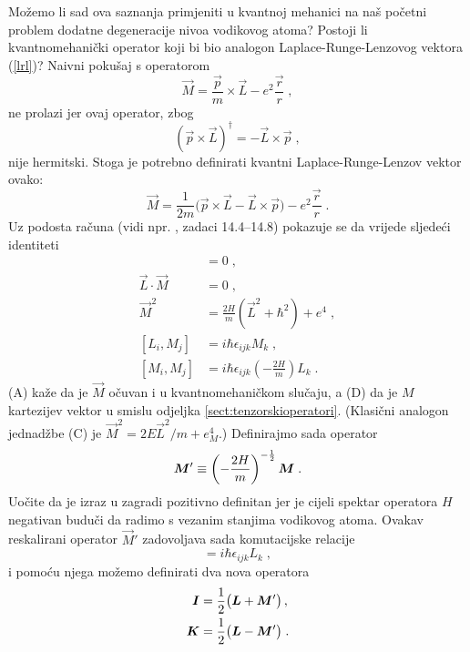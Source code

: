 Možemo li sad ova saznanja primjeniti u kvantnoj mehanici na naš
početni problem dodatne degeneracije nivoa vodikovog atoma?
Postoji li kvantnomehanički operator koji bi bio analogon 
Laplace-Runge-Lenzovog vektora (\ref{lrl})? Naivni pokušaj
s operatorom
\begin{equation}
  \vec{M} = \frac{\vec{p}}{m}\times\vec{L} - e^2\frac{\vec{r}}{r} \;,
\end{equation}
ne prolazi jer ovaj operator, zbog 
\begin{displaymath}
    (\vec{p}\times\vec{L})^\dagger = - \vec{L}\times\vec{p} \;,
\end{displaymath}
nije hermitski. Stoga je potrebno definirati kvantni
Laplace-Runge-Lenzov vektor ovako:
\begin{equation}
  \vec{M} = \frac{1}{2m}\big(\vec{p}\times\vec{L}- \vec{L}\times\vec{p}\big) 
- e^2\frac{\vec{r}}{r} \;.
\end{equation}
Uz podosta računa (vidi npr. \cite{Greiner:1989}, zadaci 14.4--14.8) 
pokazuje se da vrijede sljedeći identiteti
\begin{align}
 [\vec{M}, H] &= 0 \;, \tag{A} \\
 \vec{L}\cdot\vec{M} &= 0 \;, \tag{B} \\
\vec{M}^2 &= \frac{2 H}{m}(\vec{L}^2 + \hbar^2) + e^4  \;, \tag{C} \\
 [L_i, M_j] &= i\hbar \epsilon_{ijk} M_k \;, \tag{D} \\
[M_i, M_j] &= i \hbar \epsilon_{ijk} \left(- \frac{2H}{m}\right) L_k \tag{E} \;.
\end{align}
(A) kaže da je $\vec{M}$ očuvan i u kvantnomehaničkom slučaju, a (D) da
je $M$ kartezijev vektor u smislu odjeljka \ref{sect:tenzorskioperatori}.
(Klasični analogon jednadžbe (C) je $\vec{M}^2 = 2E\vec{L}^2/m + e_{M}^4$.)
Definirajmo sada operator 
\begin{equation}
\vec{M}' \equiv \left(- \frac{2H}{m}\right)^{-\fhalf} \vec{M} \;.
\end{equation}
Uočite da je izraz u zagradi pozitivno definitan jer je cijeli spektar operatora $H$
negativan buduči da radimo s vezanim stanjima vodikovog atoma.
Ovakav reskalirani operator $\vec{M}'$ zadovoljava sada komutacijske
relacije
\begin{equation}
[M'_i, M'_j] = i \hbar \epsilon_{ijk}  L_k \tag{E'} \;,
\end{equation}
i pomoću njega možemo definirati dva nova operatora
\begin{align}
\vec{I} &= \fhalf \big(\vec{L} + \vec{M}'\big) \,, \\
\vec{K} &= \fhalf \big(\vec{L} - \vec{M}'\big) \;.
\end{align}
